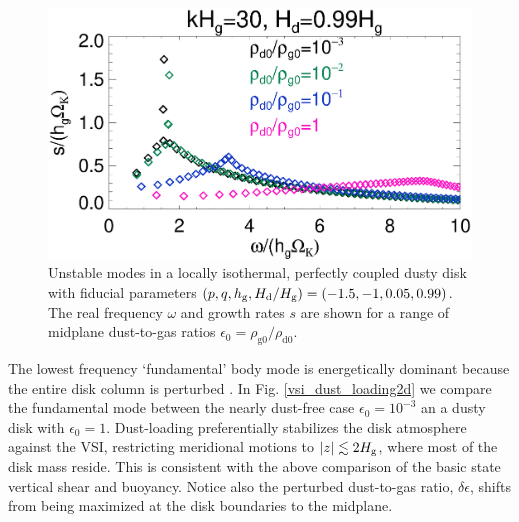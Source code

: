 \begin{figure}
  \includegraphics[width=\linewidth]{figures/compare_eigenvals_kx30Hd1} 
  \caption{Unstable modes in a locally isothermal, perfectly coupled
    dusty disk with fiducial parameters
    $(p,q,h_\mathrm{g}, H_\mathrm{d}/H_\mathrm{g} )=(-1.5,-1,0.05, 0.99)$. The real
    frequency $\omega$ and growth rates $s$ are shown for a range of
    midplane dust-to-gas ratios $\epsilon_0=\rho_\mathrm{g0}/\rho_\mathrm{d0}$. 
    \label{vsi_dust_loading}
    }
\end{figure}

The lowest frequency `fundamental' body mode is energetically dominant
because the entire disk column is perturbed \citep[cf. surface modes
  which only disturb the disk boundaries,][]{umurhan16c}. In Fig. \ref{vsi_dust_loading2d}
we compare the fundamental mode between the nearly 
dust-free case $\epsilon_0=10^{-3}$ an a dusty disk with
$\epsilon_0=1$. Dust-loading preferentially
stabilizes the disk atmosphere against the VSI, restricting
meridional motions to $|z|\lesssim 2H_\mathrm{g}$, where most of the disk mass
reside. This is consistent with the above comparison of the basic state vertical
shear and buoyancy. Notice also the perturbed dust-to-gas ratio,
$\delta\epsilon$, shifts from being maximized at the disk boundaries
to the midplane. 

